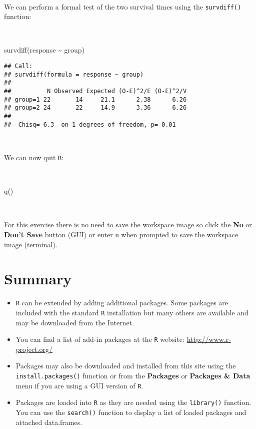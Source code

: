 \documentclass[
  12pt,
  a4paper]{book}
\newenvironment{Shaded}{\begin{snugshade}}{\end{snugshade}}
\newcommand{\FunctionTok}[1]{\textcolor[rgb]{0.00,0.00,0.00}{#1}}
\newcommand{\NormalTok}[1]{#1}
\newcommand{\SpecialCharTok}[1]{\textcolor[rgb]{0.00,0.00,0.00}{#1}}
\begin{document}
~

We can perform a formal test of the two survival times using the \texttt{survdiff()} function:

~

\begin{Shaded}
\begin{Highlighting}[]
\FunctionTok{survdiff}\NormalTok{(response }\SpecialCharTok{\textasciitilde{}}\NormalTok{ group)}
\end{Highlighting}
\end{Shaded}

\begin{verbatim}
## Call:
## survdiff(formula = response ~ group)
## 
##          N Observed Expected (O-E)^2/E (O-E)^2/V
## group=1 22       14     21.1      2.38      6.26
## group=2 24       22     14.9      3.36      6.26
## 
##  Chisq= 6.3  on 1 degrees of freedom, p= 0.01
\end{verbatim}

~

We can now quit \texttt{R}:

~

\begin{Shaded}
\begin{Highlighting}[]
\FunctionTok{q}\NormalTok{()}
\end{Highlighting}
\end{Shaded}

~

For this exercise there is no need to save the workspace image so click the \textbf{No} or \textbf{Don't Save} button (GUI) or enter \texttt{n} when prompted to save the workspace image (terminal).

\hypertarget{summary-4}{%
\section{Summary}\label{summary-4}}

\begin{itemize}
\item
  \texttt{R} can be extended by adding additional packages. Some packages are included with the standard \texttt{R} installation but many others are available and may be downloaded from the Internet.
\item
  You can find a list of add-in packages at the \texttt{R} website: \url{http://www.r-project.org/}
\item
  Packages may also be downloaded and installed from this site using the \texttt{install.packages()} function or from the \textbf{Packages} or \textbf{Packages \& Data} menu if you are using a GUI version of \texttt{R}.
\item
  Packages are loaded into \texttt{R} as they are needed using the \texttt{library()} function. You can use the \texttt{search()} function to display a list of loaded packages and attached data.frames.
\end{itemize}
\end{document}
